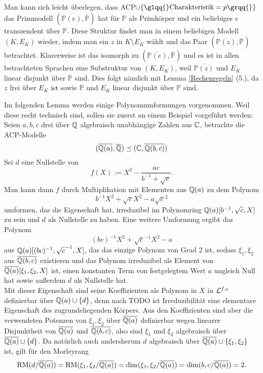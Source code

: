     \begin{remark}
    	Man kann sich leicht überlegen, dass ACP$\cup\{\glqq{}\text{Charakteristik}=p\grqq{}\}$ das Primmodell $(\overline{\mathbb{P}(e)},\overline{\mathbb{P}})$ hat für $\mathbb{P}$ als Primkörper und ein beliebiges $e$ transzendent über $\mathbb{P}$. Diese Struktur findet man in einem beliebigen Modell $(K,E_K)$ wieder, indem man ein $z$ in $K\setminus E_K$ wählt und das Paar $(\overline{\mathbb{P}(z)},\overline{\mathbb{P}})$ betrachtet. Klarerweise ist das isomorph zu $(\overline{\mathbb{P}(e)},\overline{\mathbb{P}})$ und es ist in allen betrachteten Sprachen eine Substruktur von $(K,E_K)$, weil $\overline{\mathbb{P}(z)}$ und $E_K$ linear disjunkt über $\overline{\mathbb{P}}$ sind. Dies folgt nämlich mit Lemma \ref{Rechenregeln} (5.), da $z$ frei über $E_K$ ist sowie $\mathbb{P}$ und $E_K$ linear disjunkt über $\mathbb{P}$ sind.
    \end{remark}
    \newpage
    Im folgenden Lemma werden einige Polynomumformungen vorgenommen. Weil diese recht technisch sind, sollen sie zuerst an einem Beispiel vorgeführt werden: Seien $a,b,c$ drei über $\mathbb{Q}$ algebraisch unabhängige Zahlen aus $\mathbb{C}$, betrachte die ACP-Modelle $$(\overline{\mathbb{Q}(a)},\overline{\mathbb{Q}})\preceq(\mathbb{C},\overline{\mathbb{Q}(b,c)})$$ Sei $d$ eine Nullstelle von $$f(X):=X^2-\frac{ac}{b^{-1}+\sqrt{c}}.$$ Man kann dann $f$ durch Multiplikation mit Elementen aus $\mathbb{Q}(a)$ zu dem Polynom $$b^{-1}X^2+\sqrt{c}X^2-a\sqrt{c}^2$$ umformen, das die Eigenschaft hat, irreduzibel im Polynomring $\mathbb{Q}(a)[b^{-1},\sqrt{c},X]$ zu sein und $d$ als Nullstelle zu haben. Eine weitere Umformung ergibt das Polynom $$(bc)^{-1}X^2+\sqrt{c}^{-1}X^2-a$$ aus $\mathbb{Q}(a)[(bc)^{-1},\sqrt{c}^{-1},X]$, das das einzige Polynom von Grad 2 ist, sodass $\xi_1,\xi_2$ aus $\overline{\mathbb{Q}(b,c)}$ existieren und das Polynom irreduzibel als Element von $\overline{\mathbb{Q}(a)}[\xi_1,\xi_2,X]$ ist, einen konstanten Term von festgelegtem Wert $a$ ungleich Null hat sowie außerdem $d$ als Nullstelle hat.\\
    Mit dieser Eigenschaft sind seine Koeffizienten als Polynom in $X$ in $\mathcal{L}^{f,c}$ definierbar über $\mathbb{Q}(a)\cup\{d\}$, denn nach TODO ist Irreduzibilität eine elementare Eigenschaft des zugrundeliegenden Körpers. Aus den Koeffizienten sind aber die verwendeten Potenzen von $\xi_1,\xi_2$ über $\overline{\mathbb{Q}(a)}$ definierbar wegen linearer Disjunktheit von $\overline{\mathbb{Q}(a)}$ und $\overline{\mathbb{Q}(b,c)}$, also sind $\xi_1$ und $\xi_2$ algebraisch über $\overline{\mathbb{Q}(a)}\cup\{d\}$. Da natürlich auch andersherum $d$ algebraisch über $\overline{\mathbb{Q}(a)}\cup\{\xi_1,\xi_2\}$ ist, gilt für den Morleyrang $$\operatorname{RM}(d/\overline{\mathbb{Q}(a)})=\operatorname{RM}(\xi_1,\xi_2/\overline{\mathbb{Q}(a)})=\dim(\xi_1,\xi_2/\overline{\mathbb{Q}(a)})=\dim(b,c/\overline{\mathbb{Q}(a)})=2.$$
